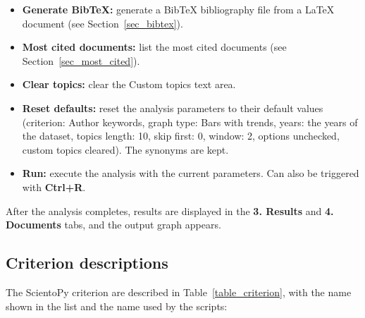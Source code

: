 \documentclass[10pt,letterpaper]{article}
\begin{document}
\begin{itemize}
\item \textbf{Generate BibTeX:} generate a BibTeX bibliography file from a LaTeX document (see Section~\ref{sec_bibtex}).
\item \textbf{Most cited documents:} list the most cited documents (see Section~\ref{sec_most_cited}).
\item \textbf{Clear topics:} clear the Custom topics text area.
\item \textbf{Reset defaults:} reset the analysis parameters to their default values (criterion: Author keywords, graph type: Bars with trends, years: the years of the dataset, topics length: 10, skip first: 0, window: 2, options unchecked, custom topics cleared). The synonyms are kept.
\item \textbf{Run:} execute the analysis with the current parameters. Can also be triggered with \textbf{Ctrl+R}.
\end{itemize}

After the analysis completes, results are displayed in the \textbf{3. Results} and \textbf{4. Documents} tabs, and the output graph appears.

\subsection{Criterion descriptions}

The ScientoPy criterion are described in Table~\ref{table_criterion}, with the name shown in the list and the name used by the scripts:
\end{document}
